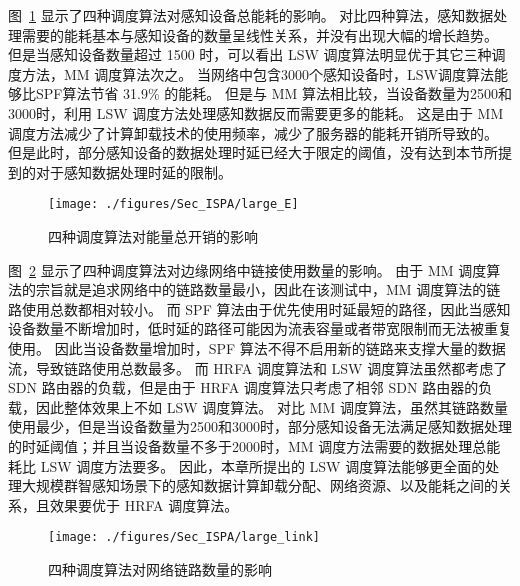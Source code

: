 
图~\ref{fig_largeE} 显示了四种调度算法对感知设备总能耗的影响。
对比四种算法，感知数据处理需要的能耗基本与感知设备的数量呈线性关系，并没有出现大幅的增长趋势。
但是当感知设备数量超过 1500 时，可以看出 LSW 调度算法明显优于其它三种调度方法，MM 调度算法次之。
当网络中包含3000个感知设备时，LSW调度算法能够比SPF算法节省 31.9\% 的能耗。
但是与 MM 算法相比较，当设备数量为2500和3000时，利用 LSW 调度方法处理感知数据反而需要更多的能耗。
这是由于 MM 调度方法减少了计算卸载技术的使用频率，减少了服务器的能耗开销所导致的。
但是此时，部分感知设备的数据处理时延已经大于限定的阈值，没有达到本节所提到的对于感知数据处理时延的限制。

\begin{figure}[!h]
  \centering
  \texttt{[image: ./figures/Sec\_ISPA/large\_E]}
  \vspace{-0.5em}
  \caption{四种调度算法对能量总开销的影响}
  \label{fig_largeE}
  \vspace{-1em}
\end{figure}

图~\ref{fig_largeL} 显示了四种调度算法对边缘网络中链接使用数量的影响。
由于 MM 调度算法的宗旨就是追求网络中的链路数量最小，因此在该测试中，MM 调度算法的链路使用总数都相对较小。
而 SPF 算法由于优先使用时延最短的路径，因此当感知设备数量不断增加时，低时延的路径可能因为流表容量或者带宽限制而无法被重复使用。
因此当设备数量增加时，SPF 算法不得不启用新的链路来支撑大量的数据流，导致链路使用总数最多。
而 HRFA 调度算法和 LSW 调度算法虽然都考虑了 SDN 路由器的负载，但是由于 HRFA 调度算法只考虑了相邻 SDN 路由器的负载，因此整体效果上不如 LSW 调度算法。
对比 MM 调度算法，虽然其链路数量使用最少，但是当设备数量为2500和3000时，部分感知设备无法满足感知数据处理的时延阈值；并且当设备数量不多于2000时，MM 调度方法需要的数据处理总能耗比 LSW 调度方法要多。
因此，本章所提出的 LSW 调度算法能够更全面的处理大规模群智感知场景下的感知数据计算卸载分配、网络资源、以及能耗之间的关系，且效果要优于 HRFA 调度算法。

\begin{figure}[!h]
  \centering
  \texttt{[image: ./figures/Sec\_ISPA/large\_link]}
  \vspace{-0.5em}
  \caption{四种调度算法对网络链路数量的影响}
  \vspace{-1em}
  \label{fig_largeL}
\end{figure}

